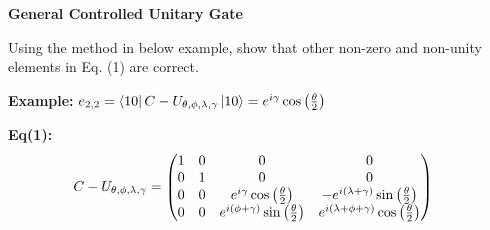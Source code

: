 \documentclass[a4paper, 10pt]{article}
\begin{document}
\begin{problem}
\textbf{General Controlled Unitary Gate}
\par Using the method in below example, show that other non-zero and non-unity elements in Eq. (1) are correct.

\noindent \textbf{Example:} \( e_{2, 2} = \bra{10} C - U_{\theta, \phi, \lambda, \gamma} \ket{10} = e^{i\gamma} \cos\left(\frac{\theta}{2}\right) \)

\noindent \textbf{Eq(1):}
\begin{align}
	C - U_{\theta, \phi, \lambda, \gamma} & =
	\begin{pmatrix}
		1 & 0 & 0                                                        & 0                                                                  \\
		0 & 1 & 0                                                        & 0                                                                  \\
		0 & 0 & e^{i\gamma} \cos\left(\frac{\theta}{2}\right)                 & -e^{i \left(\lambda + \gamma\right)} \sin\left(\frac{\theta}{2}\right)       \\
		0 & 0 & e^{i \left(\phi + \gamma\right)} \sin\left(\frac{\theta}{2}\right) & e^{i \left(\lambda + \phi + \gamma\right)} \cos\left(\frac{\theta}{2}\right)
	\end{pmatrix}
\end{align}

\end{problem}
\end{document}
